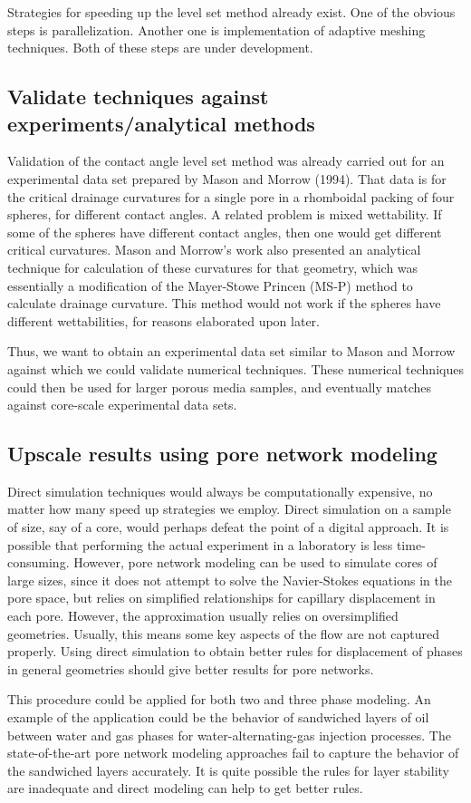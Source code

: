 Strategies for speeding up the level set method already exist. One of the obvious steps is parallelization. Another one is implementation of adaptive meshing techniques. Both of these steps are under development.
	
\subsection{Validate techniques against experiments/analytical methods}
	
Validation of the contact angle level set method was already carried out for an experimental data set prepared by Mason and Morrow (1994). That data is for the critical drainage curvatures for a single pore in a rhomboidal packing of four spheres, for different contact angles. A related problem is mixed wettability. If some of the spheres have different contact angles, then one would get different critical curvatures. Mason and Morrow's work also presented an analytical technique for calculation of these curvatures for that geometry, which was essentially a modification of the Mayer-Stowe Princen (MS-P) method to calculate drainage curvature. This method would not work if the spheres have different wettabilities, for reasons elaborated upon later. 

Thus, we want to obtain an experimental data set similar to Mason and Morrow against which we could validate numerical techniques. These numerical techniques could then be used for larger porous media samples, and eventually matches against core-scale experimental data sets.
	
\subsection{Upscale results using pore network modeling}
Direct simulation techniques would always be computationally expensive, no matter how many speed up strategies we employ. Direct simulation on a sample of size, say of a core, would perhaps defeat the point of a digital approach. It is possible that performing the actual experiment in a laboratory is less time-consuming. However, pore network modeling can be used to simulate cores of large sizes, since it does not attempt to solve the Navier-Stokes equations in the pore space, but relies on simplified relationships for capillary displacement in each pore. However, the approximation usually relies on oversimplified geometries. Usually, this means some key aspects of the flow are not captured properly. Using direct simulation to obtain better rules for displacement of phases in general geometries should give better results for pore networks.

This procedure could be applied for both two and three phase modeling. An example of the application could be the behavior of sandwiched layers of oil between water and gas phases for water-alternating-gas injection processes. The state-of-the-art pore network modeling approaches fail to capture the behavior of the sandwiched layers accurately. It is quite possible the rules for layer stability are inadequate and direct modeling can help to get better rules.
